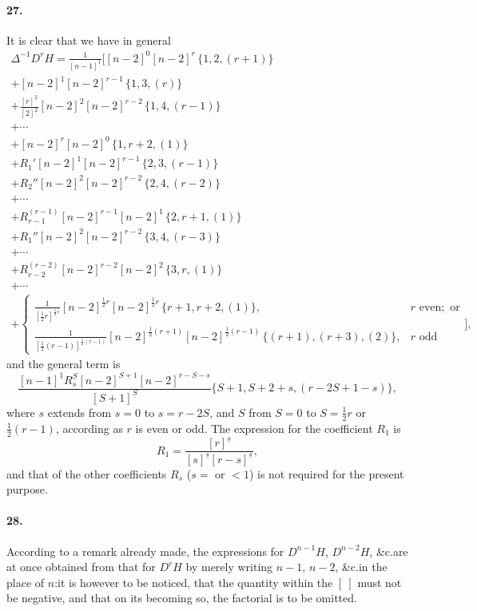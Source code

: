 \documentclass[12pt,a4paper]{article}
\theoremstyle{plain}
\begin{document}
\paragraph{27.}
It  is  clear  that  we  have  in  general
\begin{multline*}
\Delta^{-1} D^r H = \frac{1}{[n-1]^{\underline{1}}} \Bigg[
    [n-2]^0 [n-2]^r \, \{1, 2, (r+1)\} \\
  + [n-2]^1 [n-2]^{r-1} \, \{1, 3, (r)\} \\
  + \frac{[r]^{\underline{2}}}{[2]^{\underline{2}}} [n-2]^2 [n-2]^{r-2} \, \{1, 4, (r-1)\} \\
  + \cdots \\
  + [n-2]^r [n-2]^0 \, \{1, r+2, (1)\} \\
  + R_1'    [n-2]^1 [n-2]^{r-1} \, \{2, 3, (r-1)\} \\
  + R_2''   [n-2]^2 [n-2]^{r-2} \, \{2, 4, (r-2)\} \\
  + \cdots \\
  + R_{r-1}^{(r-1)} [n-2]^{r-1} [n-2]^1 \, \{2, r+1, (1)\} \\
  + R_1''    [n-2]^2 [n-2]^{r-2} \, \{3, 4, (r-3)\} \\
  + \cdots \\
  + R_{r-2}^{(r-2)} [n-2]^{r-2} [n-2]^2 \, \{3, r, (1)\} \\
  + \cdots \\
  + \begin{cases}
    \frac{1}{[\frac{1}{2}r]^{\underline{\frac{1}{2}r}}} [n-2]^{\frac{1}{2}r} [n-2]^{\frac{1}{2}r} \, \{r+1, r+2, (1)\}, & r \text{ even}; \text{ or} \\
    \frac{1}{[\frac{1}{2}(r-1)]^{\underline{\frac{1}{2}(r-1)}}} [n-2]^{\frac{1}{2}(r+1)} [n-2]^{\frac{1}{2}(r-1)} \, \{(r+1), (r+3), (2)\}, & r \text{ odd}
    \end{cases}
\Bigg],
\end{multline*}
and  the  general  term  is
\[
\frac{[n-1]^{\underline{1}} R_s^{\underline{S}} [n-2]^{S+1} [n-2]^{r-S-s}}{[S+1]^{\underline{S}}}
    \{S+1, S+2+s, (r-2S+1-s)\},
\]
where  $s$  extends  from  $s = 0$  to  $s = r - 2S$,  and  $S$  from  $S = 0$  to  $S = \frac{1}{2}r$  or  $\frac{1}{2}(r-1)$,  according
as  $r$  is  even  or  odd.     The  expression  for  the  coefficient  $R_1$  is
\[
R_1 = \frac{[r]^{\underline{s}}}{[s]^{\underline{s}} [r-s]^{\underline{s}}},
\]
and  that  of  the  other  coefficients  $R_s$ ($s = $ or $< 1$)  is  not  required  for  the  present  purpose.

\paragraph{28.}
According  to  a  remark  already  made,  the  expressions  for  $D^{n-1}H$, $D^{n-2}H$,  \&c.\@  are
at  once  obtained  from  that  for  $D^r H$  by  merely  writing  $n-1$, $n-2$,  \&c.\@  in  the  place
of  $n$:\@  it  is  however  to  be  noticed,  that  the  quantity  within  the  $[\ ]$  must  not  be
negative,  and  that  on  its  becoming  so,  the  factorial  is  to  be  omitted.
\end{document}
